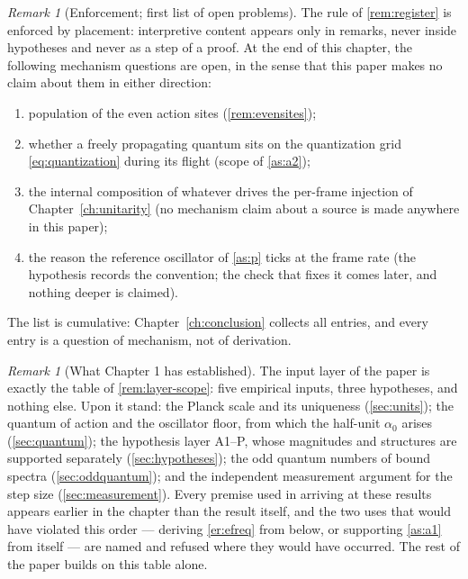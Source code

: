 \documentclass[11pt]{amsbook}
\theoremstyle{plain}
\theoremstyle{definition}
\theoremstyle{remark}
\newtheorem{remark}[theorem]{Remark}
\begin{document}
\begin{remark}[Enforcement; first list of open problems]\label{rem:mechanismregistry}
The rule of \cref{rem:register} is enforced by placement: interpretive content appears only in remarks, never inside hypotheses and never as a step of a proof. At the end of this chapter, the following mechanism questions are open, in the sense that this paper makes no claim about them in either direction:
\begin{enumerate}
\item population of the even action sites (\cref{rem:evensites});
\item whether a freely propagating quantum sits on the quantization grid \cref{eq:quantization} during its flight (scope of \cref{as:a2});
\item the internal composition of whatever drives the per-frame injection of Chapter~\ref{ch:unitarity} (no mechanism claim about a source is made anywhere in this paper);
\item the reason the reference oscillator of \cref{as:p} ticks at the frame rate (the hypothesis records the convention; the check that fixes it comes later, and nothing deeper is claimed).
\end{enumerate}
The list is cumulative: Chapter~\ref{ch:conclusion} collects all entries, and every entry is a question of mechanism, not of derivation.
\end{remark}

\begin{remark}[What Chapter 1 has established]\label{rem:ch1summary}
The input layer of the paper is exactly the table of \cref{rem:layer-scope}: five empirical inputs, three hypotheses, and nothing else. Upon it stand: the Planck scale and its uniqueness (\cref{sec:units}); the quantum of action and the oscillator floor, from which the half-unit $\alpha_{0}$ arises (\cref{sec:quantum}); the hypothesis layer A1--P, whose magnitudes and structures are supported separately (\cref{sec:hypotheses}); the odd quantum numbers of bound spectra (\cref{sec:oddquantum}); and the independent measurement argument for the step size (\cref{sec:measurement}). Every premise used in arriving at these results appears earlier in the chapter than the result itself, and the two uses that would have violated this order --- deriving \cref{er:efreq} from below, or supporting \cref{as:a1} from itself --- are named and refused where they would have occurred. The rest of the paper builds on this table alone.
\end{remark}
\end{document}
